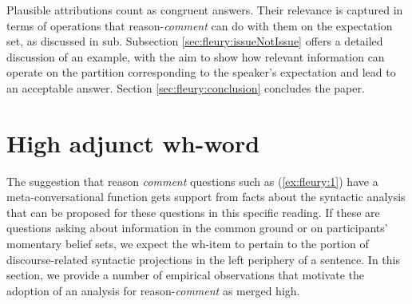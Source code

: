 \documentclass[output=paper,colorlinks,citecolor=brown,
]{langscibook}
\begin{document}
Plausible attributions  count as congruent answers. Their relevance is captured in terms of  operations that reason-\textit{comment} can do with them on the expectation set, as discussed in 
 sub.
Subsection  \ref{sec:fleury:issueNotIssue} offers a detailed discussion of an example, with the aim to show how  relevant information can operate on the partition corresponding to the speaker's expectation 
and lead to an acceptable answer. Section  \ref{sec:fleury:conclusion} concludes the paper.



\section{High adjunct wh-word}\label{sec:fleury:high}

 
 The suggestion that reason \textit{comment} questions such as  (\ref{ex:fleury:1}) have a meta-con\-ver\-sa\-tional function gets support from facts about the syntactic analysis that can be proposed for these questions in this specific reading.
   If these are questions asking about  information in the common ground or on 
   participants' momentary belief sets,
we expect  the wh-item to pertain to the portion of discourse-related syntactic projections in the left periphery of a sentence.  In this section, we  provide a number of empirical observations that motivate the adoption of an analysis for reason-\textit{comment} as merged high.
  
\end{document}
